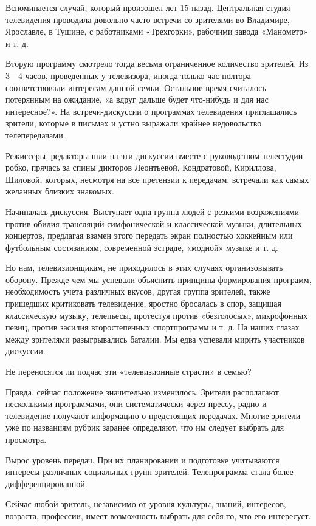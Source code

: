 \documentclass[12pt, a4paper, openany]{book}
\begin{document}
Вспоминается случай, который произошел лет 15 назад. Центральная студия телевидения проводила довольно часто встречи со зрителями во Владимире, Ярославле, в Тушине, с работниками «Трехгорки», рабочими завода «Манометр» и т. д.

Вторую программу смотрело тогда весьма ограниченное количество зрителей. Из 3—4 часов, проведенных у телевизора, иногда только час-полтора соответствовали интересам данной семьи. Остальное время считалось потерянным на ожидание, «а вдруг дальше будет что-нибудь и для нас интересное?». На встречи-дискуссии о программах телевидения приглашались зрители, которые в письмах и устно выражали крайнее недовольство телепередачами. 

Режиссеры, редакторы шли на эти дискуссии вместе с руководством телестудии робко, прячась за спины дикторов Леонтьевой, Кондратовой, Кириллова, Шиловой, которых, несмотря на все претензии к передачам, встречали как самых желанных близких знакомых. 

Начиналась дискуссия. Выступает одна группа людей с резкими возражениями против обилия трансляций симфонической и классической музыки, длительных концертов, предлагая взамен этого передать экран полностью хоккейным или футбольным состязаниям, современной эстраде, «модной» музыке и т. д. 

Но нам, телевизионщикам, не приходилось в этих случаях организовывать оборону. Прежде чем мы успевали объяснить принципы формирования программ, необходимость учета различных вкусов, другая группа зрителей, также пришедших критиковать телевидение, яростно бросалась в спор, защищая классическую музыку, телепьесы, протестуя против «безголосых», микрофонных певиц, против засилия второстепенных спортпрограмм и т. д. На наших глазах между зрителями разыгрывались баталии. Мы едва успевали мирить участников дискуссии. 

Не переносятся ли подчас эти «телевизионные страсти» в семью? 

Правда, сейчас положение значительно изменилось. Зрители располагают несколькими программами, они систематически через прессу, радио и телевидение получают информацию о предстоящих передачах. Многие зрители уже по названиям рубрик заранее определяют, что им следует выбрать для просмотра. 

Вырос уровень передач. При их планировании и подготовке учитываются интересы различных социальных групп зрителей. Телепрограмма стала более дифференцированной. 

Сейчас любой зритель, независимо от уровня культуры, знаний, интересов, возраста, профессии, имеет возможность выбрать для себя то, что его интересует. 
\end{document}
